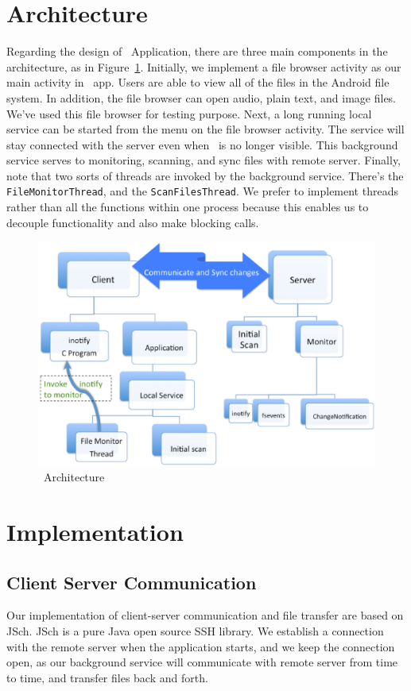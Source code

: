\section{Architecture}
\label{sec:Architecture}
Regarding the design of \teledroid\ Application, there are three main components in the architecture, as in 
Figure~\ref{fig:architecture}. Initially, we implement a file browser activity as our main activity in \teledroid\ app. 
Users are able to view all of the files in the Android file system. In addition, the file browser can open 
audio, plain text, and image files. We've used this file browser for testing purpose. Next, a long running local 
service can be started from the menu on the file browser activity. The service will stay connected with the server even when 
\teledroid\ is no longer visible. This background service serves to monitoring, scanning, and 
sync files with remote server. Finally, note that two sorts of threads are invoked by the background service. 
There's the \verb+FileMonitorThread+, and the \verb+ScanFilesThread+. We prefer to implement threads rather than all the
functions within one process because this enables us to decouple functionality and also make blocking calls.

\onecolumn
\begin{figure}[htp]
\centering
\includegraphics[scale=0.5]{architecture}
\caption{\teledroid\ Architecture}\label{fig:architecture}
\end{figure}
\twocolumn

\section{Implementation}
\label{sec:Implementation}
\subsection{Client Server Communication}
Our implementation of client-server communication and file transfer are based on JSch. JSch is a pure Java open source SSH library. We establish a connection with the remote server when the \teledroid application starts, and we keep the connection open, as our background service will communicate with remote server from time to time, and transfer files back and forth. 

